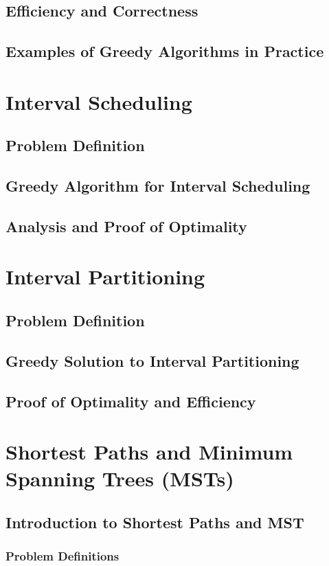 \documentclass[12pt]{book} %
\begin{document}
\subsection{Efficiency and Correctness}
\subsection{Examples of Greedy Algorithms in Practice}

\section{Interval Scheduling}
\subsection{Problem Definition}
\subsection{Greedy Algorithm for Interval Scheduling}
\subsection{Analysis and Proof of Optimality}

\section{Interval Partitioning}
\subsection{Problem Definition}
\subsection{Greedy Solution to Interval Partitioning}
\subsection{Proof of Optimality and Efficiency}

\section{Shortest Paths and Minimum Spanning Trees (MSTs)}
\subsection{Introduction to Shortest Paths and MST}
\subsubsection{Problem Definitions}
\end{document}
